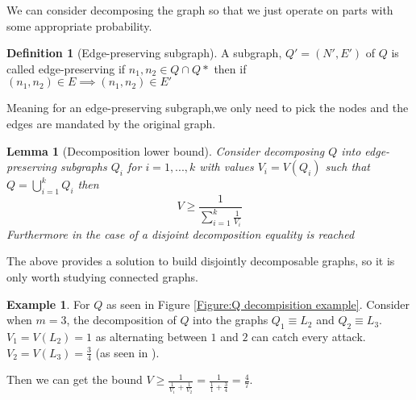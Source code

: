 \documentclass[a4paper,10pt]{article}
\newtheorem{lemma}[theorem]{Lemma}
\theoremstyle{definition}
\newtheorem{definition}[theorem]{Definition}
\theoremstyle{definition}
\newtheorem{example}[theorem]{Example}
\theoremstyle{remark}
\theoremstyle{definition}
\begin{document}
We can consider decomposing the graph so that we just operate on parts with some appropriate probability.

\begin{definition}[Edge-preserving subgraph]
A subgraph, $Q'=(N',E')$ of $Q$ is called edge-preserving if $n_{1},n_{2} \in Q \cap Q*$ then if $(n_{1},n_{2}) \in E \implies (n_{1},n_{2}) \in E'$ 
\end{definition}

Meaning for an edge-preserving subgraph,we only need to pick the nodes and the edges are mandated by the original graph.

\begin{lemma}[Decomposition lower bound]
Consider decomposing $Q$ into edge-preserving subgraphs $Q_{i}$ for $i=1,...,k$ with values $V_{i}=V(Q_{i})$ such that $Q=\bigcup\limits_{i=1}^{k} Q_{i}$ then
$$V \geq \frac{1}{\sum\limits_{i=1}^{k} \frac{1}{V_{i}}} $$
Furthermore in the case of a disjoint decomposition equality is reached
\end{lemma}

The above provides a solution to build disjointly decomposable graphs, so it is only worth studying connected graphs.


\begin{example}
For $Q$ as seen in Figure \ref{Figure:Q decompisition example}. Consider when $m=3$, the decomposition of $Q$ into the graphs $Q_{1} \equiv L_{2}$ and $Q_{2} \equiv L_{3}$. $V_{1}=V(L_{2})=1$ as alternating between $1$ and $2$ can catch every attack. $V_{2}=V(L_{3})=\frac{3}{4}$ (as seen in \cite{Alpern2011}). 

Then we can get the bound $V \geq \frac{1}{\frac{1}{V_{1}}+\frac{1}{V_{2}}} = \frac{1}{\frac{1}{1}+\frac{3}{4}}=\frac{4}{7}$.
\end{example}

\begin{myfigure}
\begin{center}
\end{center}
\caption{Decomposition of Q into \textcolor{blue}{$Q_{1}$} and \textcolor{red}{$Q_{2}$}.}
\label{Figure:Q decompisition example}
\end{myfigure}
\end{document}
